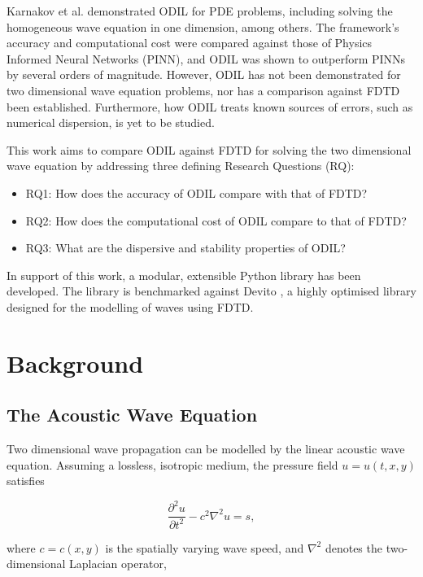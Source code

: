 \documentclass[final-report]{report-template}
\newcommand{\wave}{\frac{\partial^2 u}{\partial t^2} - c^2\nabla^2 u = s}
\begin{document}
Karnakov et al. \cite{karnakovSolvingInverseProblems2024a} demonstrated ODIL for PDE problems, including solving the homogeneous wave equation in one dimension, among others. The framework's accuracy and computational cost were compared against those of Physics Informed Neural Networks (PINN), and ODIL was shown to outperform PINNs by several orders of magnitude. However, ODIL has not been demonstrated for two dimensional wave equation problems, nor has a comparison against FDTD been established. Furthermore, how ODIL treats known sources of errors, such as numerical dispersion, is yet to be studied. 

This work aims to compare ODIL against FDTD for solving the two dimensional wave equation by addressing three defining Research Questions (RQ):

\begin{itemize}
    \item RQ1: \label{rq:1} How does the accuracy of ODIL compare with that of FDTD?
    \item RQ2: \label{rq:2} How does the computational cost of ODIL compare to that of FDTD?
    \item RQ3: \label{rq:3} What are the dispersive and stability properties of ODIL?
\end{itemize}

In support of this work, a modular, extensible Python library has been developed. The library is benchmarked against Devito \cite{louboutinDevitoV310Embedded2019}, a highly optimised library designed for the modelling of waves using FDTD.   

\newpage
\section{Background}
\label{sect:background}

\subsection{The Acoustic Wave Equation}
\label{subsect:wave_eq}

Two dimensional wave propagation can be modelled by the linear acoustic wave equation. Assuming a lossless, isotropic medium, the pressure field $u = u(t,x,y)$ satisfies

\begin{equation}
    \wave,
    \label{eq:wave}
\end{equation}

where $c = c(x,y)$ is the spatially varying wave speed, and $\nabla^2$ denotes the two-dimensional Laplacian operator,
\end{document}
